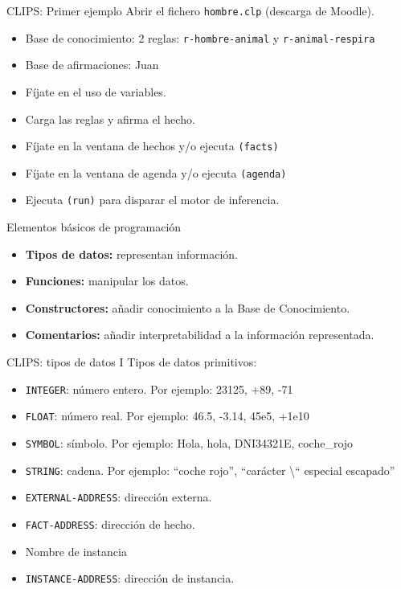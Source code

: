 \documentclass[usenames,dvipsnames,aspectratio=169]{beamer}
\begin{document}
\begin{frame}{CLIPS: Primer ejemplo}
	Abrir el fichero \texttt{hombre.clp} (descarga de Moodle).
	\begin{itemize}
		\item Base de conocimiento: 2 reglas: \texttt{r-hombre-animal} y \texttt{r-animal-respira}
		\item Base de afirmaciones: Juan
		\item Fíjate en el uso de variables.
		\item Carga las reglas y afirma el hecho.
		\item Fíjate en la ventana de hechos y/o ejecuta \texttt{(facts)}
		\item Fíjate en la ventana de agenda y/o ejecuta \texttt{(agenda)}
		\item Ejecuta \texttt{(run)} para disparar el motor de inferencia.
	\end{itemize}
\end{frame}

\begin{frame}{Elementos básicos de programación}
	\begin{itemize}
		\item \textbf{Tipos de datos:} representan información.
		\item \textbf{Funciones:} manipular los datos.
		\item \textbf{Constructores:} añadir conocimiento a la Base de Conocimiento.
		\item \textbf{Comentarios:} añadir interpretabilidad a la información representada.
	\end{itemize}
\end{frame}

\begin{frame}{CLIPS: tipos de datos I}
	Tipos de datos primitivos:
	\begin{itemize}
		\item \texttt{INTEGER}: número entero. Por ejemplo: 23125, +89, -71
		\item \texttt{FLOAT}: número real. Por ejemplo: 46.5, -3.14, 45e5, +1e10
		\item \texttt{SYMBOL}: símbolo. Por ejemplo: Hola, hola, DNI34321E, coche\_rojo
		\item \texttt{STRING}: cadena. Por ejemplo: ``coche rojo'', ``carácter \textbackslash`` especial escapado''
		\item \texttt{EXTERNAL-ADDRESS}: dirección externa.
		\item \texttt{FACT-ADDRESS}: dirección de hecho.
		\item Nombre de instancia
		\item \texttt{INSTANCE-ADDRESS}: dirección de instancia.
	\end{itemize}
\end{frame}
\end{document}
